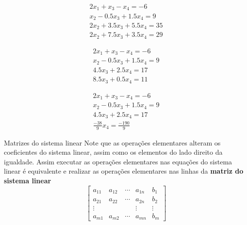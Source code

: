 \documentclass{beamer}
\begin{document}
\begin{frame}
  \begin{gather*}
    2x_1 + x_3 -x_4 = -6\\
     x_2 -0.5x_3+ 1.5x_4 = 9 \\
     2x_2+3.5x_3+5.5x_4=35 \\
     2x_2 + 7.5x_3 +3.5x_4 =29
  \end{gather*}
\end{frame}


\begin{frame}{ }
  \begin{gather*}
    2x_1 + x_3 -x_4 = -6\\
     x_2 -0.5x_3+ 1.5x_4 = 9 \\
     4.5x_3+2.5x_4=17 \\
     8.5x_3 +0.5x_4 =11
  \end{gather*}
\end{frame}

\begin{frame}{ }
  \begin{gather*}
    2x_1 + x_3 -x_4 = -6\\
     x_2 -0.5x_3+ 1.5x_4 = 9 \\
     4.5x_3+2.5x_4=17 \\
      \frac{-38}{9}x_4 = \frac{-190}{9}
  \end{gather*}
\end{frame}

\begin{frame}{Matrizes do sistema linear}
  Note que as operações elementares alteram os coeficientes
  do sistema linear, assim como os elementos do lado direito da igualdade.
  Assim executar as operações elementares nas equações 
  do sistema linear é equivalente e realizar as operações
  elementares nas linhas da \textbf{matriz do sistema linear}
  $$
  \left[\begin{array}{cccc|c}
    a_{11} & a_{12} & \cdots & a_{1n} & b_1 \\
    a_{21} & a_{22} & \cdots & a_{2n} & b_2 \\
    \vdots &        &        & \vdots & \vdots \\
    a_{m1} & a_{m2} & \cdots & a_{mn} & b_m 
  \end{array}\right]
  $$
\end{frame}
\end{document}
